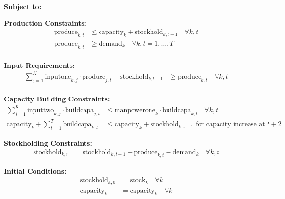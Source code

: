 \documentclass{article}
\begin{document}
\textbf{Subject to:}

\textbf{Production Constraints:}
\[
\begin{aligned}
\text{produce}_{k,t} & \leq \text{capacity}_k + \text{stockhold}_{k,t-1} \quad \forall k, t \\
\text{produce}_{k,t} & \geq \text{demand}_k \quad \forall k, t=1,\ldots,T \\
\end{aligned}
\]

\textbf{Input Requirements:}
\[
\begin{aligned}
\sum_{j=1}^{K} \text{inputone}_{k,j} \cdot \text{produce}_{j,t} + \text{stockhold}_{k,t-1} & \geq \text{produce}_{k,t} \quad \forall k, t \\
\end{aligned}
\]

\textbf{Capacity Building Constraints:}
\[
\begin{aligned}
\sum_{j=1}^{K} \text{inputtwo}_{k,j} \cdot \text{buildcapa}_{j,t} & \leq \text{manpowerone}_k \cdot \text{buildcapa}_{k,t} \quad \forall k, t \\
\text{capacity}_k + \sum_{t=1}^{T} \text{buildcapa}_{k,t} & \leq \text{capacity}_k + \text{stockhold}_{k,t-1} \text{ for capacity increase at } t+2
\end{aligned}
\]

\textbf{Stockholding Constraints:}
\[
\begin{aligned}
\text{stockhold}_{k,t} & = \text{stockhold}_{k,t-1} + \text{produce}_{k,t} - \text{demand}_{k} \quad \forall k, t
\end{aligned}
\]

\textbf{Initial Conditions:}
\[
\begin{aligned}
\text{stockhold}_{k,0} & = \text{stock}_k \quad \forall k \\
\text{capacity}_k & = \text{capacity}_k \quad \forall k
\end{aligned}
\]
\end{document}
